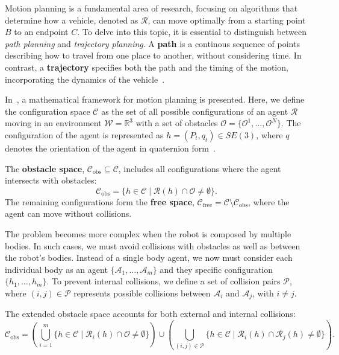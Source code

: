 Motion planning is a fundamental area of research, focusing on algorithms that determine how a vehicle, denoted as $\mathcal{R}$, can move optimally from a starting point $B$ to an endpoint $C$. To delve into this topic, it is essential to distinguish between \textit{path planning} and \textit{trajectory planning}. A \textbf{path} is a continous sequence of points describing how to travel from one place to another, without considering time. In contrast, a \textbf{trajectory} specifies both the path and the timing of the motion, incorporating the dynamics of the vehicle~\cite{wolek2017model}.

In~\cite{lavalle2006planning}, a mathematical framework for motion planning is presented. Here, we define the configuration space $\mathcal{C}$ as the set of all possible configurations of an agent $\mathcal{R}$ moving in an environment $\mathcal{W} = \mathbb{R}^3$ with a set of obstacles $\mathcal{O} = \{\mathcal{O}^1, \dots, \mathcal{O}^N\}$. The configuration of the agent is represented as $h = (P_t, q_t) \in SE\left(3\right)$, where $q$ denotes the orientation of the agent in quaternion form~\cite{trawny2005indirect}.

The \textbf{obstacle space}, $\mathcal{C}_{\text{obs}} \subseteq \mathcal{C}$, includes all configurations where the agent intersects with obstacles:
\[
\mathcal{C}_{\text{obs}} = \{ h \in \mathcal{C} \mid \mathcal{R}(h) \cap \mathcal{O} \neq \emptyset \}.
\]
The remaining configurations form the \textbf{free space}, $\mathcal{C}_{\text{free}} = \mathcal{C} \setminus \mathcal{C}_{\text{obs}}$, where the agent can move without collisions.

The problem becomes more complex when the robot is composed by multiple bodies. In such cases, we must avoid collisions with obstacles as well as between the robot's bodies. Instead of a single body agent, we now must consider each individual body as an agent $\{\mathcal{A}_1, \dots, \mathcal{A}_m\}$ and they specific configuration  $\{ h_1, \dots, h_m \}$. To prevent internal collisions, we define a set of collision pairs $\mathcal{P}$, where $(i, j) \in \mathcal{P}$ represents possible collisions between $\mathcal{A}_i$ and $\mathcal{A}_j$, with $i \neq j$.

The extended obstacle space accounts for both external and internal collisions:
\[
\mathcal{C}_{\text{obs}} = \left( \bigcup_{i=1}^m \{h \in \mathcal{C} \mid \mathcal{R}_i(h) \cap \mathcal{O} \neq \emptyset\} \right) \cup \left( \bigcup_{(i, j) \in \mathcal{P}} \{h \in \mathcal{C} \mid \mathcal{R}_i(h) \cap \mathcal{R}_j(h) \neq \emptyset\} \right).
\]

